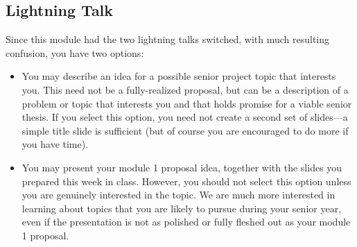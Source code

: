 \subsection*{Lightning Talk}
{\color{blue}Since this module had the two lightning talks switched, with
much resulting confusion, you have two options:
\begin{itemize}
\item
You may describe an idea for a possible senior project topic that interests
you. This need not be a fully-realized proposal, but can be a description
of a problem or topic that interests you and that holds promise for a
viable senior thesis. If you select this option, you need not create a
second set of slides---a simple title slide is sufficient (but of course
you are encouraged to do more if you have time).
\item
You may present your module 1 proposal idea, together with the slides you
prepared this week in class. However, you should not select this option 
unless you are
genuinely interested in the topic. We are much more interested in learning
about topics that you are likely to pursue during your senior year, even if
the presentation is not as polished or fully fleshed out as your module
1 proposal.
\end{itemize}
}


